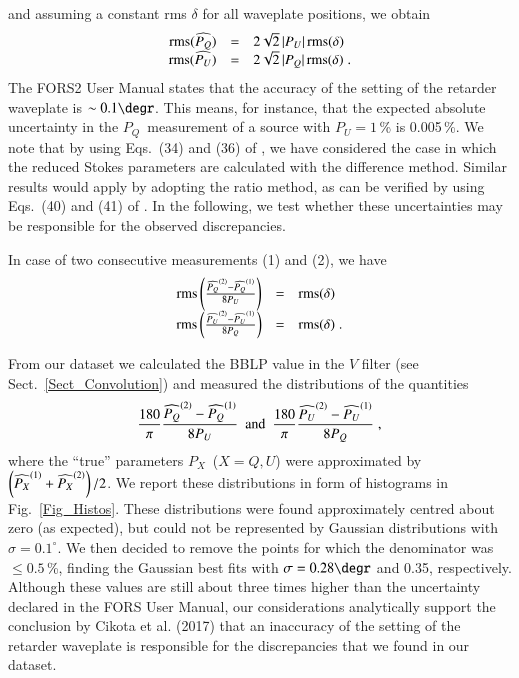 \documentclass[a4paper]{aa}
\newcommand{\pq}{\ensuremath{P_Q}}
\newcommand{\pu}{\ensuremath{P_U}}
\newcommand{\px}{\ensuremath{P_{X}}}
\begin{document}
and assuming a constant rms $\delta$ for all waveplate positions, we obtain
\begin{equation}
  \begin{array}{rcl}
{\rm rms}(\widehat{\pq}) &=& 2 \sqrt{2}\, \vert \pu \vert\,  {\rm rms}(\delta)\\
{\rm rms}(\widehat{\pu}) &=& 2 \sqrt{2}\, \vert \pq \vert\,  {\rm rms}(\delta) \; . \\
  \end{array}
\end{equation}
The FORS2 User Manual states that the accuracy of the setting of
the retarder waveplate is $\sim 0.1\degr$. This means, for instance,
that the expected absolute uncertainty in the \pq\ measurement of a
source with $\pu = 1$\,\% is 0.005\,\%.  We note that by using
Eqs.~(34) and (36) of \citet{Bagetal09}, we have considered the case in
which the reduced Stokes parameters are calculated with the difference
method. Similar results would apply by adopting the ratio method, as
can be verified by using Eqs.~(40) and (41) of \citet{Bagetal09}.  In
the following, we test whether these uncertainties may be responsible for
the observed discrepancies.

In case of two consecutive measurements (1) and (2), we have
\begin{equation}
  \begin{array}{rcl}
{\rm rms}\left(\frac{\widehat{\pq}^{(2)}-\widehat{\pq}^{(1)}}{8 \pu}\right) &=& {\rm rms}(\delta) \\
{\rm rms}\left(\frac{\widehat{\pu}^{(2)}-\widehat{\pu}^{(1)}}{8 \pq}\right) &=& {\rm rms}(\delta)\; . \\
  \end{array}
  \end{equation}

From our dataset we calculated the BBLP value in the $V$ filter (see Sect.~\ref{Sect_Convolution})
and measured the distributions of the quantities
\[
\frac{180}{\pi}\frac{\widehat{\pq}^{\rm (2)} - \widehat{\pq}^{\rm (1)}}{8\pu}\ \ {\rm and} \ \
\frac{180}{\pi}\frac{\widehat{\pu}^{\rm (2)} - \widehat{\pu}^{\rm (1)}}{8\pq}\; ,
\]
where the ``true'' parameters \px\ ($X=Q,U$) were approximated by
$\left(\widehat{\px}^{\rm (1)} + \widehat{\px}^{\rm (2)}\right)/2$.
We report these distributions in form of histograms in
Fig.~\ref{Fig_Histos}. These distributions were found approximately
centred about zero (as expected), but could not be represented by
Gaussian distributions with $\sigma = 0.1^\circ$. We then decided to
remove the points for which the denominator was $\le 0.5$\,\%, finding
the Gaussian best fits with $\sigma = 0.28\degr$ and 0.35\degr,
respectively. Although these values are still $\text{about
three} $ times higher
than the uncertainty declared in the FORS User Manual, our considerations analytically support the conclusion by Cikota et
al. (2017) that an inaccuracy of the setting of the retarder
waveplate is responsible for the discrepancies that we found in our
dataset. 
\end{document}
